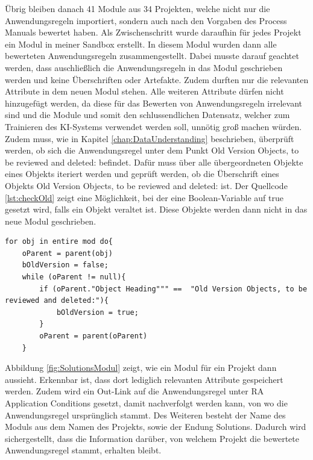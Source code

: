 Übrig bleiben danach 41 Module aus 34 Projekten, welche nicht nur die Anwendungsregeln importiert, sondern auch nach den Vorgaben des Process Manuals bewertet haben. Als Zwischenschritt wurde daraufhin
für jedes Projekt ein Modul in meiner Sandbox erstellt. In diesem Modul wurden dann alle bewerteten Anwendungsregeln zusammengestellt. Dabei musste darauf geachtet werden, dass auschließlich die
Anwendungsregeln in das Modul geschrieben werden und keine Überschriften oder Artefakte. Zudem durften nur die relevanten Attribute in dem neuen Modul stehen. Alle weiteren Attribute dürfen nicht
hinzugefügt werden, da diese für das Bewerten von Anwendungsregeln irrelevant sind und die Module und somit den schlussendlichen Datensatz, welcher zum Trainieren des KI-Systems verwendet werden soll,
unnötig groß machen würden. Zudem muss, wie in Kapitel \ref*{chap:DataUnderstanding} beschrieben, überprüft werden, ob sich die Anwendungsregel unter dem Punkt 
\glqq Old Version Objects, to be reviewed and deleted: \grqq{} befindet. Dafür muss über alle übergeordneten Objekte eines Objekts iteriert werden und geprüft werden, ob die Überschrift eines Objekts 
\glqq Old Version Objects, to be reviewed and deleted: \grqq{} ist. Der Quellcode \ref*{lst:checkOld} zeigt eine Möglichkeit, bei der eine Boolean-Variable auf true gesetzt wird, falls ein Objekt
veraltet ist. Diese Objekte werden dann nicht in das neue Modul geschrieben.

\begin{lstlisting}[caption={Prüfen, ob Objekt veraltet ist}, captionpos=b, label = lst:checkOld] 
for obj in entire mod do{ 
    oParent = parent(obj)
    bOldVersion = false;
    while (oParent != null){
        if (oParent."Object Heading""" ==  "Old Version Objects, to be reviewed and deleted:"){
            bOldVersion = true;
        }
        oParent = parent(oParent)
    }
\end{lstlisting}

Abbildung \ref*{fig:SolutionsModul} zeigt, wie ein Modul für ein Projekt dann aussieht. Erkennbar ist, dass dort lediglich relevanten Attribute gespeichert werden. Zudem wird ein Out-Link auf die
Anwendungsregel unter RA Application Conditions gesetzt, damit nachverfolgt werden kann, von wo die Anwendungsregel ursprünglich stammt. Des Weiteren besteht der Name des Moduls aus dem Namen
des Projekts, sowie der Endung  Solutions. Dadurch wird sichergestellt, dass die Information darüber, von welchem Projekt die bewertete Anwendungsregel stammt, erhalten bleibt.

